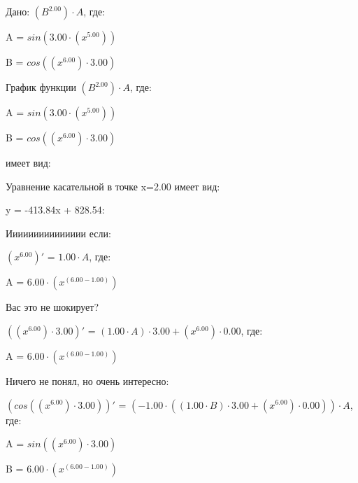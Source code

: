 \documentclass{article}
\begin{document}
Дано: $({B}^{2.00}) \cdot A$, где:

\bigskip\qquad A = $sin(3.00 \cdot ({x}^{5.00}))$

\qquad B = $cos(({x}^{6.00}) \cdot 3.00)$

\bigskip График функции $({B}^{2.00}) \cdot A$, где:

\bigskip\qquad A = $sin(3.00 \cdot ({x}^{5.00}))$

\qquad B = $cos(({x}^{6.00}) \cdot 3.00)$

имеет вид:

\begin{figure}[h]\label{fig:t}\end{figure}Уравнение касательной в точке x=2.00 имеет вид:

y = -413.84x + 828.54:

\bigskip Иииииииииииииии если:

$({x}^{6.00})'$ = $1.00 \cdot A$, где:

\bigskip\qquad A = $6.00 \cdot ({x}^{(6.00 - 1.00)})$



\bigskip Вас это не шокирует?

$(({x}^{6.00}) \cdot 3.00)'$ = $(1.00 \cdot A) \cdot 3.00 + ({x}^{6.00}) \cdot 0.00$, где:

\bigskip\qquad A = $6.00 \cdot ({x}^{(6.00 - 1.00)})$



\bigskip Ничего не понял, но очень интересно:

$(cos(({x}^{6.00}) \cdot 3.00))'$ = $(-1.00 \cdot ((1.00 \cdot B) \cdot 3.00 + ({x}^{6.00}) \cdot 0.00)) \cdot A$, где:

\bigskip\qquad A = $sin(({x}^{6.00}) \cdot 3.00)$

\qquad B = $6.00 \cdot ({x}^{(6.00 - 1.00)})$
\end{document}
